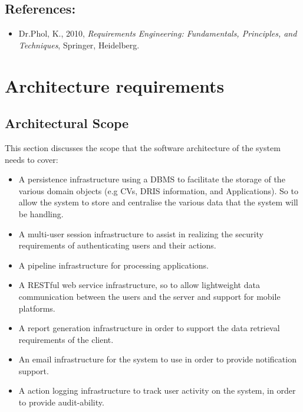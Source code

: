\documentclass[12pt]{article}
\begin{document}
\vspace{0.2in}

\subsection{References:}
\vspace{0.1in}
\begin{itemize}
\item Dr.Phol, K., 2010, \textit{Requirements Engineering: Fundamentals, Principles, and Techniques}, Springer, Heidelberg.
\end{itemize}	

\vspace{0.5in}

\newpage
\section{Architecture requirements}

\subsection{Architectural Scope}
This section discusses the scope that the software architecture of the system needs to cover:
\begin{itemize}
\item A persistence infrastructure using a DBMS to facilitate the storage of the various domain objects (e.g CVs, DRIS information, and Applications). So to allow the system to store and centralise the various data that the system will be handling.
\item A multi-user session infrastructure to assist in realizing the security requirements of authenticating users and their actions.
\item A pipeline infrastructure for processing applications. 
\item A RESTful web service infrastructure, so to allow lightweight data communication between the users and the server and support for mobile platforms.
\item A report generation infrastructure in order to support the data retrieval requirements of the client.
\item An email infrastructure for the system to use in order to provide notification support.
\item A action logging infrastructure to track user activity on the system, in order to provide audit-ability.

\end{itemize}
\end{document}
